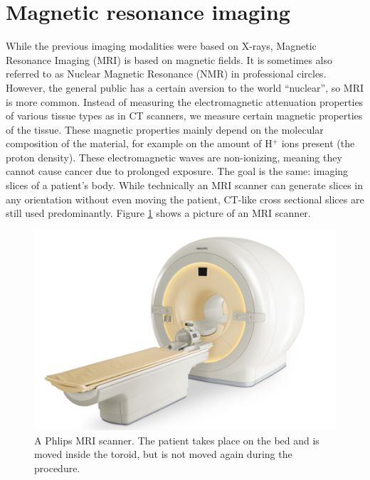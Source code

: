 \section{Magnetic resonance imaging}\label{sec:mri}
While the previous imaging modalities were based on X-rays, Magnetic Resonance
Imaging (MRI) is based on magnetic fields. It is sometimes also referred to as
Nuclear Magnetic Resonance (NMR) in professional circles. However, the general
public has a certain aversion to the world ``nuclear'', so MRI is more common.
Instead of measuring the electromagnetic attenuation properties of various
tissue types as in CT scanners, we measure certain magnetic properties of the
tissue. These magnetic properties mainly depend on the molecular composition of
the material, for example on the amount of H$^+$ ions present (the proton
density). These electromagnetic waves are non-ionizing, meaning they cannot
cause cancer due to prolonged exposure. The goal is the same: imaging slices of
a patient's body. While technically an MRI scanner can generate slices in any
orientation without even moving the patient, CT-like cross sectional slices
are still used predominantly. Figure \ref{fig:mriscanner} shows a picture of an MRI
scanner.

\begin{figure}[ht]
\begin{center}
  \includegraphics[width=\linewidth]{img/mriscanner.jpg}
  \caption{A Phlips MRI scanner. The patient takes place on the bed and is
  moved inside the toroid, but is not moved again during the procedure.}
  \label{fig:mriscanner}
\end{center}
\end{figure}


